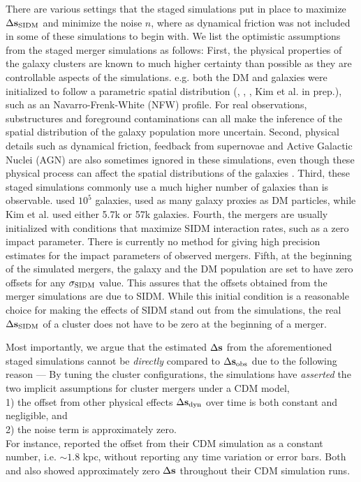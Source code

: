 There are various settings that the staged simulations put in place to maximize
$\Delta {\bf s}_{{\rm SIDM}}$ and minimize the noise $n$, where as  
dynamical friction was not included in some of these
simulations to begin with. 
We list the optimistic assumptions from the staged merger simulations as follows: 
First, the physical properties of the galaxy
clusters are known to much higher certainty than possible as they are
controllable aspects of the simulations. e.g. both the DM and 
galaxies were initialized to follow a parametric spatial 
distribution   
(\citealt{Randall2008d}, \citealt{Kahlhoefer14}, \citealt{Robertson2016}, Kim
et al. in prep.), 
such as an Navarro-Frenk-White (NFW) profile. For real observations,
substructures and foreground
contaminations can all make the inference of the spatial distribution 
of the galaxy population more uncertain. 
Second, physical details such as dynamical friction, feedback from supernovae and Active
Galactic Nuclei (AGN) are also sometimes ignored in these simulations, 
even though these physical process can affect the spatial distributions of the
galaxies \citep{Cui2015}.  
Third, these staged simulations commonly use a much higher number of 
galaxies than is observable. \cite{Randall2008d} used
$10^5$ galaxies, \cite{Kahlhoefer14} used as many galaxy proxies as DM particles, 
while Kim et al. used either 5.7k or 57k galaxies. 
Fourth, the mergers are usually initialized with conditions that maximize SIDM
interaction rates, such as a zero impact parameter. There is currently no
method for giving high precision estimates for the impact parameters of observed mergers. 
Fifth, at the beginning of the simulated mergers, the galaxy and the DM
population are set to have zero offsets for any $\sigma_{\rm SIDM}$ value. 
This assures that the offsets obtained from the merger simulations are due to SIDM. 
While this initial condition 
is a reasonable choice for making the effects of SIDM stand out from the simulations, 
the real $\Delta {\bf s}_{{\rm SIDM}}$ of a cluster does not have to be zero at the beginning of a merger.  

Most importantly, we argue that the estimated $\Delta {\bf s}$ 
from the aforementioned staged simulations cannot be
{\it directly}
compared to $\Delta {\bf s}_{\rm obs}$ due to the following reason --- 
By tuning the cluster configurations, the simulations have {\it asserted}
the two implicit assumptions for cluster mergers under a CDM model, \\
1) the offset from other physical effects $\Delta {\bf s}_{\rm dyn}$ over time 
is both constant and negligible, 
and \\ 
2) the noise term is approximately zero.\\ 
For instance, \cite{Randall2008d} reported the offset from their CDM simulation 
as a constant number, i.e. $\sim 1.8$ kpc, without reporting any time variation or error bars. 
Both \cite{Robertson2016} and
\cite{Kahlhoefer14} also showed approximately zero $\Delta {\bf s}$ throughout their CDM 
simulation runs.   

